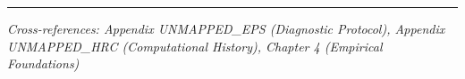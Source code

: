 \vspace{1em}
\hrule
\vspace{0.5em}
\noindent\textit{Cross-references: Appendix UNMAPPED_EPS (Diagnostic Protocol), 
Appendix UNMAPPED_HRC (Computational History), Chapter 4 (Empirical Foundations)}

% 
%
%
%
%
%
%
